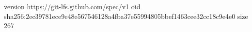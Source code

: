 version https://git-lfs.github.com/spec/v1
oid sha256:2ec39781ece9e48e567546128a4fba37e55994805bbef1463cee32cc18c9e4e0
size 267
